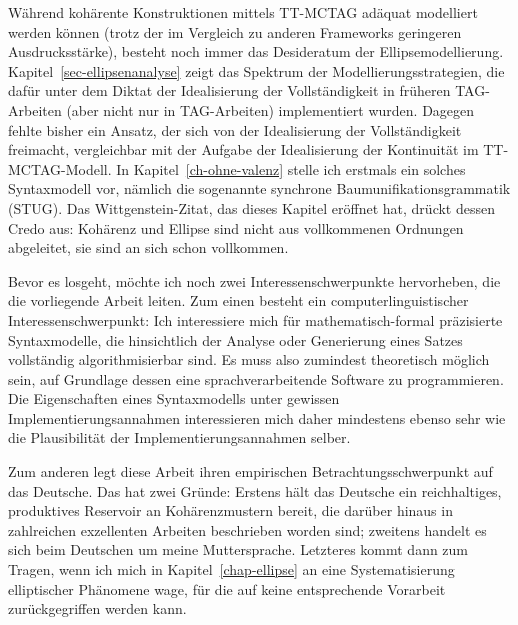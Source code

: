 Während kohärente Konstruktionen mittels TT-MCTAG adäquat modelliert werden können (trotz der im Vergleich zu anderen Frameworks geringeren Ausdrucksstärke), besteht noch immer das Desideratum der Ellipsemodellierung. Kapitel~\ref{sec-ellipsenanalyse} zeigt das Spektrum der Modellierungsstrategien, die dafür unter dem Diktat der Idealisierung der Vollständigkeit in früheren TAG-Arbeiten (aber nicht nur in TAG-Arbeiten) implementiert wurden. Dagegen fehlte bisher ein Ansatz, der sich von der Idealisierung der Vollständigkeit freimacht, vergleichbar mit der Aufgabe der Idealisierung der Kontinuität im TT-MCTAG-Modell. In Kapitel~\ref{ch-ohne-valenz} stelle ich erstmals ein solches Syntaxmodell vor, nämlich die sogenannte synchrone Baumunifikationsgrammatik (STUG). Das Wittgenstein-Zitat, das dieses Kapitel eröffnet hat, drückt dessen Credo aus: Kohärenz und Ellipse sind nicht aus vollkommenen Ordnungen abgeleitet, sie sind an sich schon vollkommen. %

Bevor es losgeht, möchte ich noch zwei Interessenschwerpunkte hervorheben, die die vorliegende Arbeit leiten. Zum einen besteht ein computerlinguistischer Interessenschwerpunkt: Ich interessiere mich für mathematisch-formal präzisierte Syntaxmodelle, die hinsichtlich der Analyse oder Generierung eines Satzes vollständig algorithmisierbar sind. Es muss also zumindest theoretisch möglich sein, auf Grundlage dessen eine sprachverarbeitende Software zu programmieren. Die Eigenschaften eines Syntaxmodells unter gewissen Implementierungsannahmen interessieren mich daher mindestens ebenso sehr wie die Plausibilität der Implementierungsannahmen selber.    

Zum anderen legt diese Arbeit ihren empirischen Betrachtungsschwerpunkt auf das Deutsche. Das hat zwei Gründe: Erstens hält das Deutsche ein reichhaltiges, produktives Reservoir an Kohärenzmustern bereit, die darüber hinaus in zahlreichen exzellenten Arbeiten beschrieben worden sind; zweitens handelt es sich beim Deutschen um meine Muttersprache. Letzteres kommt dann zum Tragen, wenn ich mich in Kapitel~\ref{chap-ellipse} an eine Systematisierung elliptischer Phänomene wage, für die auf keine entsprechende Vorarbeit zurückgegriffen werden kann.








